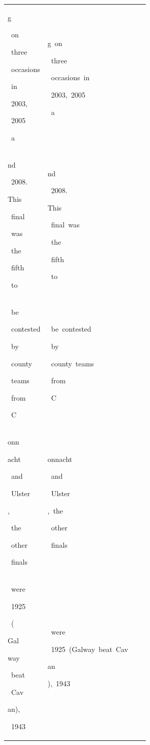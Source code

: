 \begin{table}[h]
\begin{tabular}{ l l l l }
 \colorbox{cm_40!40}{\strut g}\colorbox{cm_35!40}{\strut \ on}\colorbox{cm_48!40}{\strut \ three}\colorbox{cm_30!40}{\strut \ occasions}\colorbox{cm_32!40}{\strut \ in}\colorbox{cm_44!40}{\strut \ 2003,}\colorbox{cm_28!40}{\strut \ 2005}\colorbox{cm_31!40}{\strut \ a} & \colorbox{cm_12!40}{\strut g\ on}\colorbox{cm_0!40}{\strut \ three}\colorbox{cm_12!40}{\strut \ occasions\ in}\colorbox{cm_0!40}{\strut \ 2003,\ 2005}\colorbox{cm_12!40}{\strut \ a} &  &  \\ 
 \colorbox{cm_31!40}{\strut nd}\colorbox{cm_34!40}{\strut \ 2008.}\colorbox{cm_37!40}{\strut }\colorbox{cm_63!40}{\strut This}\colorbox{cm_9!40}{\strut \ final}\colorbox{cm_30!40}{\strut \ was}\colorbox{cm_32!40}{\strut \ the}\colorbox{cm_57!40}{\strut \ fifth}\colorbox{cm_5!40}{\strut \ to} & \colorbox{cm_12!40}{\strut nd}\colorbox{cm_0!40}{\strut \ 2008.}\colorbox{cm_12!40}{\strut }\colorbox{cm_0!40}{\strut This}\colorbox{cm_12!40}{\strut \ final\ was}\colorbox{cm_25!40}{\strut \ the}\colorbox{cm_0!40}{\strut \ fifth}\colorbox{cm_12!40}{\strut \ to} &  &  \\ 
 \colorbox{cm_29!40}{\strut \ be}\colorbox{cm_33!40}{\strut \ contested}\colorbox{cm_34!40}{\strut \ by}\colorbox{cm_31!40}{\strut \ county}\colorbox{cm_29!40}{\strut \ teams}\colorbox{cm_22!40}{\strut \ from}\colorbox{cm_59!40}{\strut \ C} & \colorbox{cm_0!40}{\strut \ be\ contested}\colorbox{cm_12!40}{\strut \ by}\colorbox{cm_0!40}{\strut \ county\ teams}\colorbox{cm_12!40}{\strut \ from}\colorbox{cm_0!40}{\strut \ C} &  &  \\ 
 \colorbox{cm_59!40}{\strut onn}\colorbox{cm_32!40}{\strut acht}\colorbox{cm_36!40}{\strut \ and}\colorbox{cm_27!40}{\strut \ Ulster}\colorbox{cm_31!40}{\strut ,}\colorbox{cm_33!40}{\strut \ the}\colorbox{cm_24!40}{\strut \ other}\colorbox{cm_63!40}{\strut \ finals} & \colorbox{cm_0!40}{\strut onnacht}\colorbox{cm_12!40}{\strut \ and}\colorbox{cm_0!40}{\strut \ Ulster}\colorbox{cm_12!40}{\strut ,\ the}\colorbox{cm_25!40}{\strut \ other}\colorbox{cm_12!40}{\strut \ finals} &  &  \\ 
 \colorbox{cm_33!40}{\strut \ were}\colorbox{cm_63!40}{\strut \ 1925}\colorbox{cm_57!40}{\strut \ (}\colorbox{cm_38!40}{\strut Gal}\colorbox{cm_32!40}{\strut way}\colorbox{cm_47!40}{\strut \ beat}\colorbox{cm_29!40}{\strut \ Cav}\colorbox{cm_32!40}{\strut an),}\colorbox{cm_12!40}{\strut \ 1943} & \colorbox{cm_12!40}{\strut \ were}\colorbox{cm_0!40}{\strut \ 1925\ (Galway\ beat\ Cav}\colorbox{cm_12!40}{\strut an}\colorbox{cm_0!40}{\strut ),\ 1943} &  &  \\ 

\end{tabular}
\end{table}
